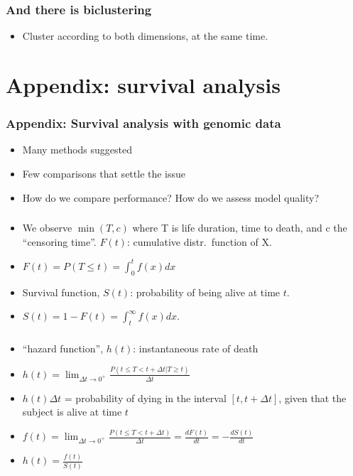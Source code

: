 \begin{frame}
  \frametitle{And there is biclustering}
  \begin{itemize}
  \item Cluster according to both dimensions, at the same time.
  \end{itemize}
\end{frame}




\section{Appendix: survival analysis}
\begin{frame}[label=Survival]
\frametitle{Appendix: Survival analysis with genomic data}
\begin{itemize}
\item Many methods suggested
\item Few comparisons that settle the issue
\item How do we compare performance? How do we assess model quality?
\end{itemize}
\end{frame}



\begin{frame}
\frametitle{}
\begin{itemize}
\item We observe $\min (T, c)$ where T is life duration, time to death, and
  c the ``censoring time''. $F(t)$: cumulative distr.\
  function of X.
\item $F(t) = P(T \le t) = \int_0^t f(x) dx$
\item Survival function, $S(t)$:
  probability of being alive at time $t$. 
\item $S(t) = 1 - F(t) = \int_t^{\infty} f(x) dx$.
\end{itemize}
\end{frame}

\begin{frame}
\frametitle{}
\begin{itemize}
\item ``hazard function'', $h(t)$: instantaneous rate of death
\item $h(t) = \lim_{\Delta t \rightarrow 0^+} \frac{P(t \le T < t +
      \Delta t | T \ge t)}{\Delta t} $
\item $h(t) \Delta t$ = probability of dying in the interval
   $\left[t, t + \Delta t \right]$, given that the subject is alive at
   time  $t$
\item $f(t) = \lim_{\Delta t \rightarrow 0^+} 
\frac{P(t \le T < t + \Delta t)}{\Delta t} = 
\frac{dF(t)}{dt} = - \frac{dS(t)}{dt} $
\item $h(t) = \frac{f(t)}{S(t)}$
\end{itemize}
\end{frame}


